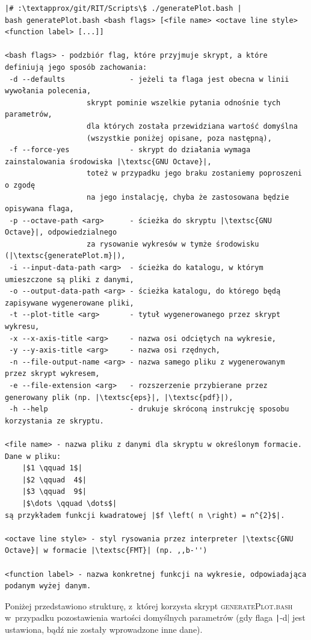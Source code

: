 \begin{verbatim}
|# :\textapprox/git/RIT/Scripts\$ ./generatePlot.bash |
bash generatePlot.bash <bash flags> [<file name> <octave line style> <function label> [...]]

<bash flags> - podzbiór flag, które przyjmuje skrypt, a które definiują jego sposób zachowania:
 -d --defaults               - jeżeli ta flaga jest obecna w linii wywołania polecenia, 
			       skrypt pominie wszelkie pytania odnośnie tych parametrów,
			       dla których została przewidziana wartość domyślna 
			       (wszystkie poniżej opisane, poza następną),
 -f --force-yes              - skrypt do działania wymaga zainstalowania środowiska |\textsc{GNU Octave}|, 
			       toteż w przypadku jego braku zostaniemy poproszeni o zgodę 
			       na jego instalację, chyba że zastosowana będzie opisywana flaga,
 -p --octave-path <arg>      - ścieżka do skryptu |\textsc{GNU Octave}|, odpowiedzialnego 
			       za rysowanie wykresów w tymże środowisku (|\textsc{generatePlot.m}|),
 -i --input-data-path <arg>  - ścieżka do katalogu, w którym umieszczone są pliki z danymi,
 -o --output-data-path <arg> - ścieżka katalogu, do którego będą zapisywane wygenerowane pliki,
 -t --plot-title <arg>       - tytuł wygenerowanego przez skrypt wykresu,
 -x --x-axis-title <arg>     - nazwa osi odciętych na wykresie,
 -y --y-axis-title <arg>     - nazwa osi rzędnych,
 -n --file-output-name <arg> - nazwa samego pliku z wygenerowanym przez skrypt wykresem,
 -e --file-extension <arg>   - rozszerzenie przybierane przez generowany plik (np. |\textsc{eps}|, |\textsc{pdf}|),
 -h --help                   - drukuje skróconą instrukcję sposobu korzystania ze skryptu.

<file name> - nazwa pliku z danymi dla skryptu w określonym formacie. Dane w pliku:
	|$1	\qquad 1$|
	|$2 \qquad	4$|
	|$3 \qquad	9$|
	|$\dots \qquad \dots$|
są przykładem funkcji kwadratowej |$f \left( n \right) = n^{2}$|.

<octave line style> - styl rysowania przez interpreter |\textsc{GNU Octave}| w formacie |\textsc{FMT}| (np. ,,b-'')

<function label> - nazwa konkretnej funkcji na wykresie, odpowiadająca podanym wyżej danym.
\end{verbatim}

Poniżej przedstawiono strukturę, z~której korzysta skrypt \textsc{generatePlot.bash} w~przypadku pozostawienia wartości domyślnych parametrów (gdy flaga \texttt|-d| jest ustawiona, bądź nie zostały wprowadzone inne dane).


